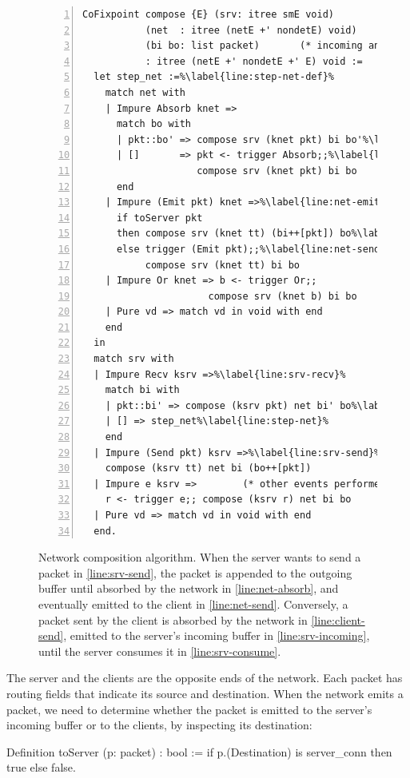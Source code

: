 \begin{figure}
\begin{lstlisting}[numbers=left]
CoFixpoint compose {E} (srv: itree smE void)          (* server  model *)
           (net  : itree (netE +' nondetE) void)      (* network model *)
           (bi bo: list packet)       (* incoming and outgoing buffers *)
           : itree (netE +' nondetE +' E) void :=
  let step_net :=%\label{line:step-net-def}%
    match net with
    | Impure Absorb knet =>
      match bo with
      | pkt::bo' => compose srv (knet pkt) bi bo'%\label{line:net-absorb}%
      | []       => pkt <- trigger Absorb;;%\label{line:client-send}%
                    compose srv (knet pkt) bi bo
      end
    | Impure (Emit pkt) knet =>%\label{line:net-emit}%
      if toServer pkt
      then compose srv (knet tt) (bi++[pkt]) bo%\label{line:srv-incoming}%
      else trigger (Emit pkt);;%\label{line:net-send}%
           compose srv (knet tt) bi bo
    | Impure Or knet => b <- trigger Or;;
                      compose srv (knet b) bi bo
    | Pure vd => match vd in void with end
    end
  in
  match srv with
  | Impure Recv ksrv =>%\label{line:srv-recv}%
    match bi with
    | pkt::bi' => compose (ksrv pkt) net bi' bo%\label{line:srv-consume}%
    | [] => step_net%\label{line:step-net}%
    end
  | Impure (Send pkt) ksrv =>%\label{line:srv-send}%
    compose (ksrv tt) net bi (bo++[pkt])
  | Impure e ksrv =>        (* other events performed by the server *)
    r <- trigger e;; compose (ksrv r) net bi bo
  | Pure vd => match vd in void with end
  end.
\end{lstlisting}
\caption[Network composition algorithm]{Network composition algorithm.  When the
  server wants to send a packet in \autoref{line:srv-send}, the packet is
  appended to the outgoing buffer until absorbed by the network
  in \autoref{line:net-absorb}, and eventually emitted to the client
  in \autoref{line:net-send}.  Conversely, a packet sent by the client is
  absorbed by the network in \autoref{line:client-send}, emitted to the server's
  incoming buffer in \autoref{line:srv-incoming}, until the server consumes it
  in \autoref{line:srv-consume}.}
\label{fig:net-compose-code}
\end{figure}

The server and the clients are the opposite ends of the network.  Each packet
has routing fields that indicate its source and destination.  When the network
emits a packet, we need to determine whether the packet is emitted to the
server's incoming buffer or to the clients, by inspecting its destination:
\begin{coq}
  Definition toServer (p: packet) : bool :=
    if p.(Destination) is server_conn then true else false.
\end{coq}

